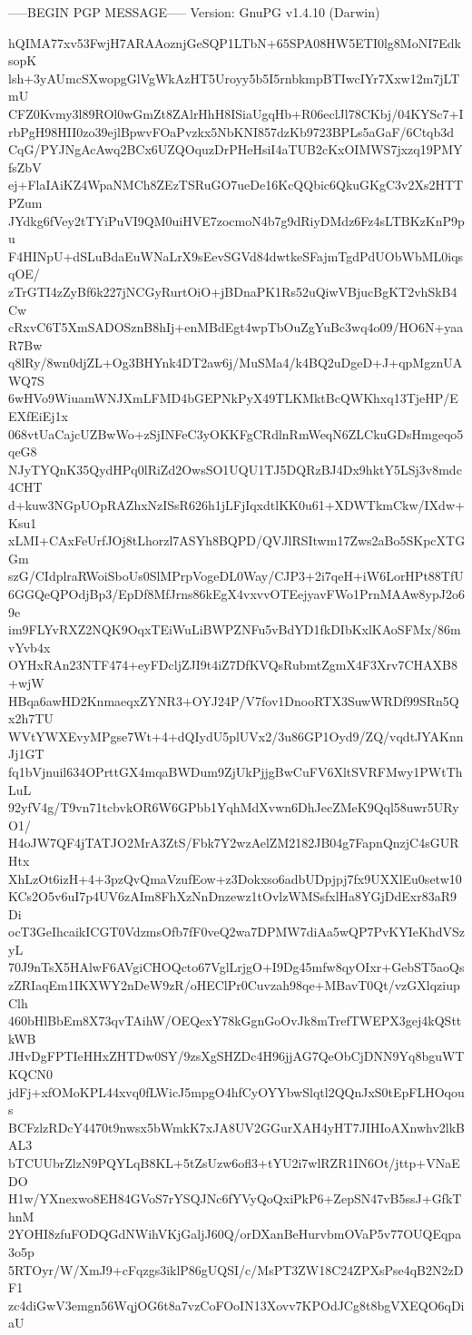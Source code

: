 -----BEGIN PGP MESSAGE-----
Version: GnuPG v1.4.10 (Darwin)

hQIMA77xv53FwjH7ARAAoznjGeSQP1LTbN+65SPA08HW5ETI0lg8MoNI7EdksopK
lsh+3yAUmcSXwopgGlVgWkAzHT5Uroyy5b5I5rnbkmpBTIwcIYr7Xxw12m7jLTmU
CFZ0Kvmy3l89ROl0wGmZt8ZAlrHhH8ISiaUgqHb+R06eclJl78CKbj/04KYSc7+I
rbPgH98HII0zo39ejlBpwvFOaPvzkx5NbKNI857dzKb9723BPLs5aGaF/6Ctqb3d
CqG/PYJNgAcAwq2BCx6UZQOquzDrPHeHsiI4aTUB2cKxOIMWS7jxzq19PMYfsZbV
ej+FlaIAiKZ4WpaNMCh8ZEzTSRuGO7ueDe16KcQQbic6QkuGKgC3v2Xs2HTTPZum
JYdkg6fVey2tTYiPuVI9QM0uiHVE7zocmoN4b7g9dRiyDMdz6Fz4sLTBKzKnP9pu
F4HINpU+dSLuBdaEuWNaLrX9sEevSGVd84dwtkeSFajmTgdPdUObWbML0iqsqOE/
zTrGTI4zZyBf6k227jNCGyRurtOiO+jBDnaPK1Rs52uQiwVBjucBgKT2vhSkB4Cw
cRxvC6T5XmSADOSznB8hIj+enMBdEgt4wpTbOuZgYuBc3wq4o09/HO6N+yaaR7Bw
q8lRy/8wn0djZL+Og3BHYnk4DT2aw6j/MuSMa4/k4BQ2uDgeD+J+qpMgznUAWQ7S
6wHVo9WiuamWNJXmLFMD4bGEPNkPyX49TLKMktBcQWKhxq13TjeHP/EEXfEiEj1x
068vtUaCajcUZBwWo+zSjINFeC3yOKKFgCRdlnRmWeqN6ZLCkuGDsHmgeqo5qeG8
NJyTYQnK35QydHPq0lRiZd2OwsSO1UQU1TJ5DQRzBJ4Dx9hktY5LSj3v8mdc4CHT
d+kuw3NGpUOpRAZhxNzISsR626h1jLFjIqxdtlKK0u61+XDWTkmCkw/IXdw+Ksu1
xLMI+CAxFeUrfJOj8tLhorzl7ASYh8BQPD/QVJlRSItwm17Zws2aBo5SKpcXTGGm
szG/CIdplraRWoiSboUs0SlMPrpVogeDL0Way/CJP3+2i7qeH+iW6LorHPt88TfU
6GGQeQPOdjBp3/EpDf8MfJrns86kEgX4vxvvOTEejyavFWo1PrnMAAw8ypJ2o69e
im9FLYvRXZ2NQK9OqxTEiWuLiBWPZNFu5vBdYD1fkDIbKxlKAoSFMx/86mvYvb4x
OYHxRAn23NTF474+eyFDcljZJI9t4iZ7DfKVQsRubmtZgmX4F3Xrv7CHAXB8+wjW
HBqa6awHD2KnmaeqxZYNR3+OYJ24P/V7fov1DnooRTX3SuwWRDf99SRn5Qx2h7TU
WVtYWXEvyMPgse7Wt+4+dQIydU5plUVx2/3u86GP1Oyd9/ZQ/vqdtJYAKnnJj1GT
fq1bVjnuil634OPrttGX4mqaBWDum9ZjUkPjjgBwCuFV6XltSVRFMwy1PWtThLuL
92yfV4g/T9vn71tcbvkOR6W6GPbb1YqhMdXvwn6DhJecZMeK9Qql58uwr5URyO1/
H4oJW7QF4jTATJO2MrA3ZtS/Fbk7Y2wzAelZM2182JB04g7FapnQnzjC4sGURHtx
XhLzOt6izH+4+3pzQvQmaVzufEow+z3Dokxso6adbUDpjpj7fx9UXXlEu0setw10
KCs2O5v6uI7p4UV6zAIm8FhXzNnDnzewz1tOvlzWMSsfxlHa8YGjDdExr83aR9Di
ocT3GeIhcaikICGT0VdzmsOfb7fF0veQ2wa7DPMW7diAa5wQP7PvKYIeKhdVSzyL
70J9nTsX5HAlwF6AVgiCHOQcto67VglLrjgO+I9Dg45mfw8qyOIxr+GebST5aoQs
zZRIaqEm1IKXWY2nDeW9zR/oHEClPr0Cuvzah98qe+MBavT0Qt/vzGXlqziupClh
460bHlBbEm8X73qvTAihW/OEQexY78kGgnGoOvJk8mTrefTWEPX3gej4kQSttkWB
JHvDgFPTIeHHxZHTDw0SY/9zsXgSHZDc4H96jjAG7QeObCjDNN9Yq8bguWTKQCN0
jdFj+xfOMoKPL44xvq0fLWicJ5mpgO4hfCyOYYbwSlqtl2QQnJxS0tEpFLHOqous
BCFzlzRDcY4470t9nwsx5bWmkK7xJA8UV2GGurXAH4yHT7JIHIoAXnwhv2lkBAL3
bTCUUbrZlzN9PQYLqB8KL+5tZsUzw6ofl3+tYU2i7wlRZR1IN6Ot/jttp+VNaEDO
H1w/YXnexwo8EH84GVoS7rYSQJNc6fYVyQoQxiPkP6+ZepSN47vB5ssJ+GfkThnM
2YOHI8zfuFODQGdNWihVKjGaljJ60Q/orDXanBeHurvbmOVaP5v77OUQEqpa3o5p
5RTOyr/W/XmJ9+cFqzgs3iklP86gUQSI/c/MsPT3ZW18C24ZPXsPse4qB2N2zDF1
zc4diGwV3emgn56WqjOG6t8a7vzCoFOoIN13Xovv7KPOdJCg8t8bgVXEQO6qDiaU
